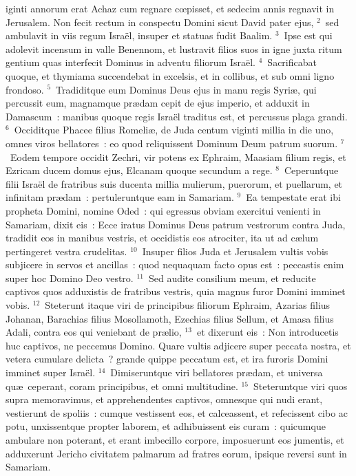 \bchapter
{}iginti annorum erat Achaz cum regnare cœpisset, et sedecim annis regnavit in Jerusalem. Non fecit rectum in conspectu Domini sicut David pater ejus,
${}^{2}$~sed ambulavit in viis regum Isra\"el, insuper et statuas fudit Baalim.
${}^{3}$~Ipse est qui adolevit incensum in valle Benennom, et lustravit filios suos in igne juxta ritum gentium quas interfecit Dominus in adventu filiorum Isra\"el.
${}^{4}$~Sacrificabat quoque, et thymiama succendebat in excelsis, et in collibus, et sub omni ligno frondoso.
${}^{5}$~Tradiditque eum Dominus Deus ejus in manu regis Syri\ae , qui percussit eum, magnamque pr\ae dam cepit de ejus imperio, et adduxit in Damascum~: manibus quoque regis Isra\"el traditus est, et percussus plaga grandi.
${}^{6}$~Occiditque Phacee filius Romeli\ae , de Juda centum viginti millia in die uno, omnes viros bellatores~: eo quod reliquissent Dominum Deum patrum suorum.
${}^{7}$~Eodem tempore occidit Zechri, vir potens ex Ephraim, Maasiam filium regis, et Ezricam ducem domus ejus, Elcanam quoque secundum a rege.
${}^{8}$~Ceperuntque filii Isra\"el de fratribus suis ducenta millia mulierum, puerorum, et puellarum, et infinitam pr\ae dam~: pertuleruntque eam in Samariam.
${}^{9}$~Ea tempestate erat ibi propheta Domini, nomine Oded~: qui egressus obviam exercitui venienti in Samariam, dixit eis~: Ecce iratus Dominus Deus patrum vestrorum contra Juda, tradidit eos in manibus vestris, et occidistis eos atrociter, ita ut ad c\ae lum pertingeret vestra crudelitas.
${}^{10}$~Insuper filios Juda et Jerusalem vultis vobis subjicere in servos et ancillas~: quod nequaquam facto opus est~: peccastis enim super hoc Domino Deo vestro.
${}^{11}$~Sed audite consilium meum, et reducite captivos quos adduxistis de fratribus vestris, quia magnus furor Domini imminet vobis.
${}^{12}$~Steterunt itaque viri de principibus filiorum Ephraim, Azarias filius Johanan, Barachias filius Mosollamoth, Ezechias filius Sellum, et Amasa filius Adali, contra eos qui veniebant de pr\ae lio,
${}^{13}$~et dixerunt eis~: Non introducetis huc captivos, ne peccemus Domino. Quare vultis adjicere super peccata nostra, et vetera cumulare delicta~? grande quippe peccatum est, et ira furoris Domini imminet super Isra\"el.
${}^{14}$~Dimiseruntque viri bellatores pr\ae dam, et universa qu\ae\ ceperant, coram principibus, et omni multitudine.
${}^{15}$~Steteruntque viri quos supra memoravimus, et apprehendentes captivos, omnesque qui nudi erant, vestierunt de spoliis~: cumque vestissent eos, et calceassent, et refecissent cibo ac potu, unxissentque propter laborem, et adhibuissent eis curam~: quicumque ambulare non poterant, et erant imbecillo corpore, imposuerunt eos jumentis, et adduxerunt Jericho civitatem palmarum ad fratres eorum, ipsique reversi sunt in Samariam.


